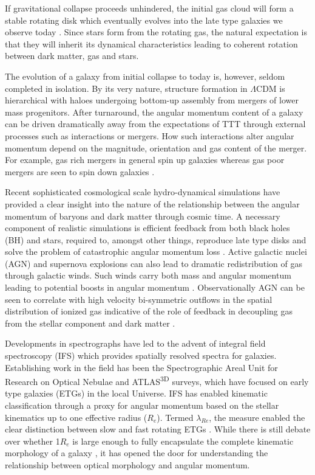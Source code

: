 \documentclass[fleqn,usenatbib]{mnras}
\begin{document}
If gravitational collapse proceeds unhindered, the initial gas cloud will form a stable rotating disk which eventually evolves into the late type galaxies we observe today \citep{white1978}. Since stars form from the rotating gas, the natural expectation is that they will inherit its dynamical characteristics leading to coherent rotation between dark matter, gas and stars. 

The evolution of a galaxy from initial collapse to today is, however, seldom completed in isolation. By its very nature, structure formation in $\Lambda$CDM is hierarchical with haloes undergoing bottom-up assembly from mergers of lower mass progenitors. After turnaround, the angular momentum content of a galaxy can be driven dramatically away from the expectations of TTT through external processes such as interactions or mergers. How such interactions alter angular momentum depend on the magnitude, orientation and gas content of the merger. For example, gas rich mergers in general spin up galaxies whereas gas poor mergers are seen to spin down galaxies \citep[][]{lagos2017,lagos2018}.

Recent sophisticated cosmological scale hydro-dynamical simulations have provided a clear insight into the nature of the relationship between the angular momentum of baryons and dark matter through cosmic time. A necessary component of realistic simulations is efficient feedback from both black holes (BH) and stars, required to, amongst other things, reproduce late type disks and solve the problem of catastrophic angular momentum loss \citep[e.g.][]{zavala2008, scannapieco2009}. Active galactic nuclei (AGN) and supernova explosions can also lead to dramatic redistribution of gas through galactic winds. Such winds carry both mass and angular momentum leading to potential boosts in angular momentum \citep[e.g.][]{DeFelippis2017}. Observationally AGN can be seen to correlate with high velocity bi-symmetric outflows in the spatial distribution of ionized gas indicative of the role of feedback in decoupling gas from the stellar component and dark matter \citep{roy2018}.

Developments in spectrographs have led to the advent of integral field spectroscopy (IFS) which provides spatially resolved spectra for galaxies. Establishing work in the field has been the Spectrographic Areal Unit for Research on Optical Nebulae \citep[SAURON;][]{sauron} and ATLAS\textsuperscript{3D} \citep{atlas3d} surveys, which have focused on early type galaxies (ETGs) in the local Universe. IFS has enabled kinematic classification through a proxy for angular momentum based on the stellar kinematics up to one effective radius ($R_e$). Termed $\lambda_{Re}$, the measure enabled the clear distinction between slow and fast rotating ETGs \citep{emsellem2007, emsellem2011}. While there is still debate over whether 1$R_{e}$ is large enough to fully encapsulate the complete kinematic morphology of a galaxy \citep{foster2013,arnold2014}, it has opened the door for understanding the relationship between optical morphology and angular momentum. 
\end{document}
